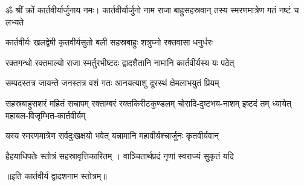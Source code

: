 

ॐ श्रीं क्रों कार्तवीर्यार्जुनाय नमः।
\twolineshloka
{कार्तवीर्यार्जुनो नाम राजा बाहुसहस्रवान्}
{तस्य स्मरणमात्रेण गतं नष्टं च लभ्यते}%

\twolineshloka
{कार्तवीर्यः खलद्वेषी कृतवीर्यसुतो बली}
{सहस्रबाहुः शत्रुघ्नो रक्तवासा धनुर्धरः}%

\twolineshloka
{रक्तगन्धो रक्तमाल्यो राजा स्मर्तुरभीष्टदः}
{द्वादशैतानि नामानि कार्तवीर्यस्य यः पठेत्}%

\twolineshloka
{सम्पदस्तत्र जायन्ते जनस्तत्र वशं गतः}
{आनयत्याशु दूरस्थं क्षेमलाभयुतं प्रियम्}%

\fourlineindentedshloka
{सहस्रबाहुसशरं महितं सचापम्}
{रक्ताम्बरं रक्तकिरीटकुण्डलम्}
{चोरादि-दुष्टभय-नाशम् इष्टदं तम्}
{ध्यायेत् महाबल-विजृम्भित-कार्तवीर्यम्}%

\twolineshloka
{यस्य स्मरणमात्रेण सर्वदुःखक्षयो भवेत्}
{यन्नामानि महावीर्यश्चार्जुनः कृतवीर्यवान्}%

\twolineshloka
{हैहयाधिपतेः स्तोत्रं सहस्रावृत्तिकारितम्} ।
{वाञ्चितार्थप्रदं नृणां स्वराज्यं सुकृतं यदि}%

॥इति कार्तवीर्य द्वादशनाम स्तोत्रम्॥